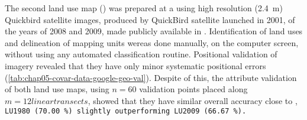%   
%   
%   
%   
%   
%   

The second land use map (\landNew{}) was prepared at a  using high resolution (\SI{2.4}{\m}) 
Quickbird satellite images, produced by QuickBird satellite launched in 2001, of the years of \num{2008} and 
\num{2009}, 
made publicly available in \googleearth{} \cite{SamuelRosaEtAl2011a}. Identification of land uses and 
delineation of mapping units wereas done manually, on the computer screen, without using any automated 
classification routine. Positional validation of \googleearth{} imagery revealed that they have only minor 
systematic positional errors (\autoref{tab:chap05-covar-data-google-geo-val}). Despite of this, the attribute 
validation of both land use maps, using $n = 60$ validation points placed along $m = 12 linear transects$, 
showed that they have similar overall accuracy close to , \tt{LU1980} (\SI{70.00}{\percent}) slightly 
outperforming 
\tt{LU2009} (\SI{66.67}{\percent}).

